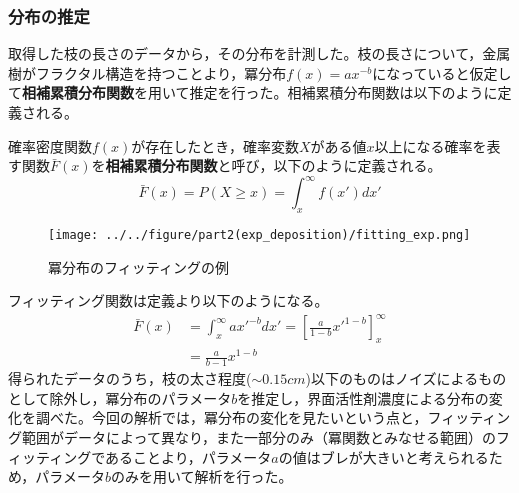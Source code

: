 \documentclass[autodetect-engine,dvi=dvipdfmx,a4paper,ja=standard,oneside,openany,11pt,draft]{bxjsarticle}
\begin{document}
\subsubsection{分布の推定}
取得した枝の長さのデータから，その分布を計測した。枝の長さについて，金属樹がフラクタル構造を持つことより，冪分布$f(x)=ax^{-b}$になっていると仮定して\textbf{相補累積分布関数}を用いて推定を行った。相補累積分布関数は以下のように定義される。
\begin{definition}
  確率密度関数$f(x)$が存在したとき，確率変数$X$がある値$x$以上になる確率を表す関数$\bar{F}(x)$を\textbf{相補累積分布関数}と呼び，以下のように定義される。
  \begin{equation}
    \bar{F}(x) = P(X \geq x) = \int_{x}^{\infty} f(x')dx'
  \end{equation}
\end{definition}
\begin{wrapfigure}{r}[0pt]{0.33\textwidth}
  \begin{center}
    \texttt{[image: ../../figure/part2(exp\_deposition)/fitting\_exp.png]}
  \end{center}
  \caption{冪分布のフィッティングの例}
  \label{fig:fitting_exp}
\end{wrapfigure}
フィッティング関数は定義より以下のようになる。
\begin{equation}
  \begin{split}
    \bar{F}(x) & = \int_{x}^{\infty} ax'^{-b}dx' = \left[ \frac{a}{1-b}x'^{1-b} \right]_{x}^{\infty} \\
               & = \frac{a}{b-1}x^{1-b}
  \end{split}
\end{equation}
得られたデータのうち，枝の太さ程度($\sim0.15\si{cm}$)以下のものはノイズによるものとして除外し，冪分布のパラメータ$b$を推定し，界面活性剤濃度による分布の変化を調べた。今回の解析では，冪分布の変化を見たいという点と，フィッティング範囲がデータによって異なり，また一部分のみ（冪関数とみなせる範囲）のフィッティングであることより，パラメータ$a$の値はブレが大きいと考えられるため，パラメータ$b$のみを用いて解析を行った。

\ifdraft{
  
  
}{}
\end{document}

